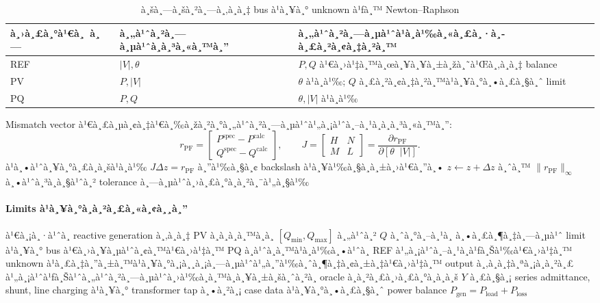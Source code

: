 ﻿\documentclass[12pt,a4paper]{article}
\begin{document}
\begin{table}[H]
\centering
\caption{à¸šà¸—à¸šà¸²à¸—à¸‚à¸­à¸‡ bus à¹à¸¥à¸° unknown à¹ƒà¸™ Newton--Raphson}
\begin{tabularx}{\textwidth}{@{}l l X@{}}
\toprule
à¸›à¸£à¸°à¹€à¸ à¸— & à¸„à¹ˆà¸²à¸—à¸µà¹ˆà¸à¸³à¸«à¸™à¸” & à¸„à¹ˆà¸²à¸—à¸µà¹ˆà¹à¸à¹‰à¸«à¸£à¸·à¸­à¸£à¸²à¸¢à¸‡à¸²à¸™ \\
\midrule
REF & $|V|,\theta$ & $P,Q$ à¹€à¸›à¹‡à¸™à¸œà¸¥à¸¥à¸±à¸žà¸˜à¹Œà¸‚à¸­à¸‡ balance \\
PV & $P,|V|$ & $\theta$ à¹à¸à¹‰; $Q$ à¸£à¸²à¸¢à¸‡à¸²à¸™à¹à¸¥à¸°à¸•à¸£à¸§à¸ˆ limit \\
PQ & $P,Q$ & $\theta,|V|$ à¹à¸à¹‰ \\
\bottomrule
\end{tabularx}
\end{table}

Mismatch vector à¹€à¸£à¸µà¸¢à¸‡à¹€à¸‰à¸žà¸²à¸°à¸„à¹ˆà¸²à¸—à¸µà¹ˆà¹„à¸¡à¹ˆà¸–à¸¹à¸à¸à¸³à¸«à¸™à¸”:
\begin{equation}
r_{\mathrm{PF}}=
\begin{bmatrix}P^{\mathrm{spec}}-P^{\mathrm{calc}}\\
Q^{\mathrm{spec}}-Q^{\mathrm{calc}}\end{bmatrix},
\qquad
J=
\begin{bmatrix}H&N\\M&L\end{bmatrix}
=\frac{\partial r_{\mathrm{PF}}}{\partial[\theta\;\;|V|]}.
\end{equation}
à¹à¸•à¹ˆà¸¥à¸°à¸£à¸­à¸šà¹à¸à¹‰ $J\Delta z=r_{\mathrm{PF}}$ à¸”à¹‰à¸§à¸¢ backslash à¹à¸¥à¹‰à¸§à¸­à¸±à¸›à¹€à¸”à¸•
$z\leftarrow z+\Delta z$ à¸ˆà¸™ $\|r_{\mathrm{PF}}\|_\infty$ à¸•à¹ˆà¸³à¸à¸§à¹ˆà¸² tolerance
à¸—à¸µà¹ˆà¸›à¸£à¸°à¸à¸²à¸¨à¹„à¸§à¹‰

\paragraph{Limits à¹à¸¥à¸°à¸à¸²à¸£à¸«à¸¢à¸¸à¸”}
à¹€à¸¡à¸·à¹ˆà¸­ reactive generation à¸‚à¸­à¸‡ PV à¸­à¸­à¸à¸™à¸­à¸ $[Q_{\min},Q_{\max}]$ à¸„à¹ˆà¸² $Q$ à¸ˆà¸°à¸–à¸¹à¸
à¸•à¸£à¸¶à¸‡à¸—à¸µà¹ˆ limit à¹à¸¥à¸° bus à¹€à¸›à¸¥à¸µà¹ˆà¸¢à¸™à¹€à¸›à¹‡à¸™ PQ à¸à¹ˆà¸­à¸™à¹à¸à¹‰à¸•à¹ˆà¸­ REF à¹„à¸¡à¹ˆà¸–à¸¹à¸à¹ƒà¸Šà¹‰à¹€à¸›à¹‡à¸™ unknown
à¹à¸£à¸‡à¸”à¸±à¸™à¹à¸¥à¸°à¸¡à¸¸à¸¡à¸—à¸µà¹ˆà¹„à¸”à¹‰à¸ˆà¸¶à¸‡à¸¢à¸±à¸‡à¹€à¸›à¹‡à¸™ output à¸‚à¸­à¸‡à¸ªà¸¡à¸à¸²à¸£ à¹„à¸¡à¹ˆà¹ƒà¸Šà¹ˆà¸„à¹ˆà¸²à¸—à¸µà¹ˆà¸›à¹‰à¸­à¸™à¸à¸¥à¸±à¸šà¸ˆà¸²à¸ oracle
à¸à¸²à¸£à¸›à¸£à¸°à¸à¸­à¸š $Y$ à¸£à¸§à¸¡ series admittance, shunt, line charging à¹à¸¥à¸° transformer tap
à¸•à¸²à¸¡ case data à¹à¸¥à¸°à¸•à¸£à¸§à¸ˆ power balance
$P_{\mathrm{gen}}=P_{\mathrm{load}}+P_{\mathrm{loss}}$
\end{document}
